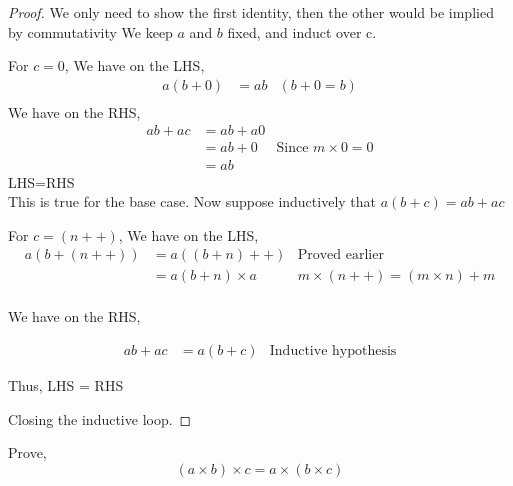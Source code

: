 \documentclass[11pt]{report}
\begin{document}
\begin{proof}
	We only need to show the first identity, then the other would be implied by commutativity
	We keep $a$ and $b$ fixed, and induct over c.

	For $c = 0 $,
	We have on the LHS,
	\begin{align*}
		a(b+0) & = ab & (b+0 = b) \\
	\end{align*}
	We have on the RHS,
	\begin{align*}
		ab + ac & = ab + a0 &                               \\
		        & = ab + 0  & \text{Since $m \times 0 = 0$} \\
		        & = ab      &
	\end{align*}
	LHS=RHS
	\\
	This is true for the base case.
	Now suppose inductively that $a(b+c) = ab + ac$

	For $c=(n++)$,
	We have on the LHS,
	\begin{align*}
		a(b+(n++)) & = a((b+n)++)      & \text{Proved earlier}             \\
		           & = a(b+n) \times a & m \times (n++) = (m \times n) + m \\
	\end{align*}

	We have on the RHS,

	\begin{align*}
		ab + ac & = a(b+c) & \text{Inductive hypothesis}
	\end{align*}

	Thus, LHS = RHS

	Closing the inductive loop.
\end{proof}
\begin{prop}
	Prove,
	\[
		(a \times b) \times c = a \times (b\times c)
	\]
\end{prop}
\end{document}
